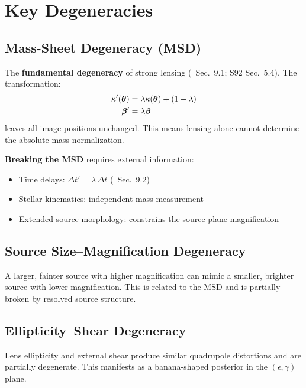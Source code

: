 \documentclass[11pt, letterpaper]{article}
\begin{document}
\section{Key Degeneracies}
\label{sec:degeneracies}

\subsection{Mass-Sheet Degeneracy (MSD)}

The \textbf{fundamental degeneracy} of strong lensing (\CK\ Sec.~9.1;
S92 Sec.~5.4). The transformation:
\begin{align}
\kappa'(\bm{\theta}) &= \lambda\kappa(\bm{\theta}) + (1-\lambda) \label{eq:msd-kappa} \\
\bm{\beta}' &= \lambda\bm{\beta} \label{eq:msd-beta}
\end{align}
leaves all image positions unchanged. This means lensing alone cannot
determine the absolute mass normalization.

\textbf{Breaking the MSD} requires external information:
\begin{itemize}[nosep]
  \item Time delays: $\Delta t' = \lambda\,\Delta t$ (\CK\ Sec.~9.2)
  \item Stellar kinematics: independent mass measurement
  \item Extended source morphology: constrains the source-plane magnification
\end{itemize}

\subsection{Source Size--Magnification Degeneracy}

A larger, fainter source with higher magnification can mimic a smaller,
brighter source with lower magnification. This is related to the MSD
and is partially broken by resolved source structure.

\subsection{Ellipticity--Shear Degeneracy}

Lens ellipticity and external shear produce similar quadrupole
distortions and are partially degenerate. This manifests as a banana-shaped
posterior in the $(\epsilon, \gamma)$ plane.
\end{document}
